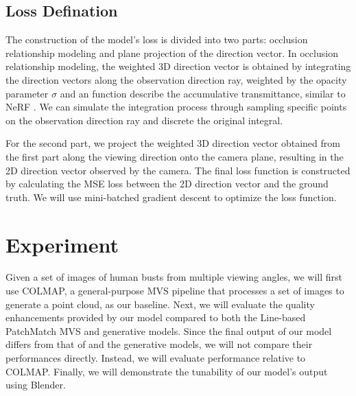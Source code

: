 \documentclass[12pt]{article}
\begin{document}
    \subsection{Loss Defination}
    
    The construction of the model's loss is divided into two parts: occlusion relationship modeling and plane projection of the direction vector. In occlusion relationship modeling, the weighted 3D direction vector is obtained by integrating the direction vectors along the observation direction ray, weighted by the opacity parameter $\sigma$ and an function describe the accumulative transmittance, similar to NeRF \cite{mildenhall_nerf_2020}. We can simulate the integration process through sampling specific points on the observation direction ray and discrete the original integral.

    For the second part, we project the weighted 3D direction vector obtained from the first part along the viewing direction onto the camera plane, resulting in the 2D direction vector observed by the camera. The final loss function is constructed by calculating the MSE loss between the 2D direction vector and the ground truth. We will use mini-batched gradient descent to optimize the loss function.
    
  \section{Experiment}

  

  Given a set of images of human busts from multiple viewing angles, we will first use COLMAP, a general-purpose MVS pipeline that processes a set of images to generate a point cloud, as our baseline. Next, we will evaluate the quality enhancements provided by our model compared to both the Line-based PatchMatch MVS \cite{nam_strand-accurate_nodate} and generative models. Since the final output of our model differs from that of \cite{nam_strand-accurate_nodate} and the generative models, we will not compare their performances directly. Instead, we will evaluate performance relative to COLMAP. Finally, we will demonstrate the tunability of our model's output using Blender.
  
  

  \printbibliography
\end{document}

